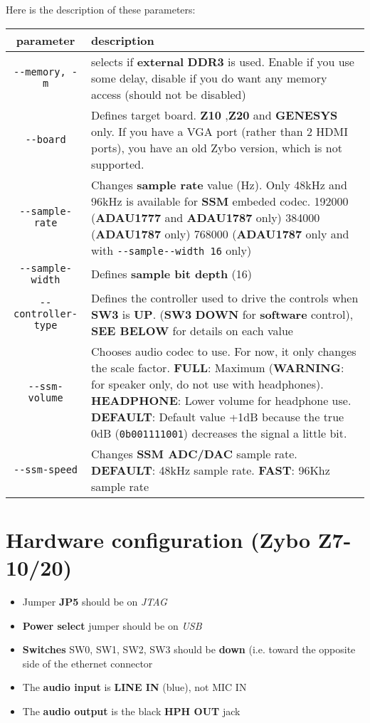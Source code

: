 Here is the description of these parameters:\\
\begin{tabular}{|c|p{12cm}|}
  \toprule
parameter & description \\
\midrule
\texttt{-\/-memory,\ -m} & selects if \textbf{external} \textbf{DDR3} is
used. Enable if you use some delay, disable if you do want any memory
access (should not be disabled) \\
\texttt{-\/-board} & Defines target board. \textbf{Z10} ,\textbf{Z20}
and \textbf{GENESYS} only. If you have a VGA port (rather than 2 HDMI
ports), you have an old Zybo version, which is not supported. \\
\texttt{-\/-sample-rate} & Changes \textbf{sample rate} value (Hz). Only
48kHz and 96kHz is available for \textbf{SSM} embeded codec. 192000
(\textbf{ADAU1777} and \textbf{ADAU1787} only) 384000 (\textbf{ADAU1787}
only) 768000 (\textbf{ADAU1787} only and with
\texttt{-\/-sample-\/-width\ 16} only) \\
\texttt{-\/-sample-width} & Defines \textbf{sample bit depth}
(16\textbar24\textbar32) \\
\texttt{-\/-controller-type} & Defines the controller used to drive the
controls when \textbf{SW3} is \textbf{UP}. (\textbf{SW3} \textbf{DOWN}
for \textbf{software} control), \textbf{SEE BELOW} for details on each
value \\
\texttt{-\/-ssm-volume} & Chooses audio codec to use. For now, it only
changes the scale factor. \textbf{FULL}: Maximum (\textbf{WARNING}: for
speaker only, do not use with headphones). \textbf{HEADPHONE}: Lower
volume for headphone use. \textbf{DEFAULT}: Default value +1dB because
the true 0dB (\texttt{0b001111001}) decreases the signal a little
bit. \\
\texttt{-\/-ssm-speed} & Changes \textbf{SSM ADC/DAC} sample rate.
\textbf{DEFAULT}: 48kHz sample rate. \textbf{FAST}: 96Khz sample rate \\
\bottomrule
\end{tabular}

\section{Hardware configuration (Zybo Z7-10/20)}
\label{hard}
\begin{itemize}

\item
  Jumper \textbf{JP5} should be on \emph{JTAG}
\item
  \textbf{Power select} jumper should be on \emph{USB}\\
\item
  \textbf{Switches} SW0, SW1, SW2, SW3 should be \textbf{down} (i.e. toward the opposite side of the ethernet connector\\
\item
  The \textbf{audio input} is \textbf{LINE IN} (blue), not MIC IN\\
\item
  The \textbf{audio output} is the black \textbf{HPH OUT} jack
\end{itemize}


